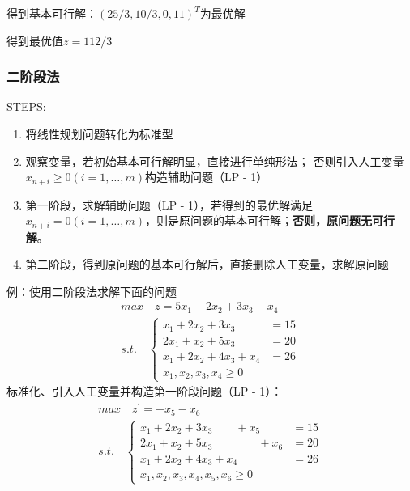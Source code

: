 \documentclass{book}
\begin{document}
得到基本可行解：$(25/3,10/3,0,11)^T$为最优解

得到最优值$z=112/3$

\subsubsection{二阶段法}
STEPS:
\begin{enumerate}
    \item 将线性规划问题转化为标准型
    \item 观察变量，若初始基本可行解明显，直接进行单纯形法；
          否则引入人工变量 $x_{n+i} \ge 0 (i= 1 , … , m)$构造辅助问题（LP - 1）
    \item 第一阶段，求解辅助问题（LP - 1），若得到的最优解满足 $x_{n+i} = 0 (i= 1 , … , m)$，则是原问题的基本可行解；\textbf{否则，原问题无可行解}。
    \item 第二阶段，得到原问题的基本可行解后，直接删除人工变量，求解原问题
\end{enumerate}

例：使用二阶段法求解下面的问题
$$
    \begin{aligned}
         & max\quad z=5x_1+2x_2+3x_3-x_4 & \\
         & s.t.\quad
        \begin{cases}
            x_1+2x_2+3x_3     & = 15 \\
            2x_1+x_2+5x_3     & = 20 \\
            x_1+2x_2+4x_3+x_4 & = 26 \\
            x_1,x_2,x_3,x_4\ge0
        \end{cases}
    \end{aligned}
$$
标准化、引入人工变量并构造第一阶段问题（LP - 1）：
$$
    \begin{aligned}
         & max\quad z^{\prime}=-x_5-x_6 & \\
         & s.t.\quad
        \begin{cases}
            x_1+2x_2+3x_3\qquad+x_5       & = 15 \\
            2x_1+x_2+5x_3\qquad\qquad+x_6 & = 20 \\
            x_1+2x_2+4x_3+x_4             & = 26 \\
            x_1,x_2,x_3,x_4,x_5,x_6\ge0
        \end{cases}
    \end{aligned}
$$
\end{document}
